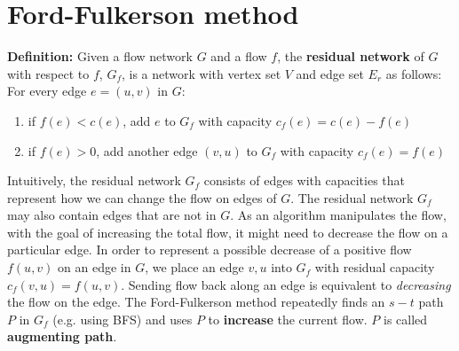 \section{Ford-Fulkerson method}
\textbf{Definition:}\newline
Given a flow network $G$ and a flow $f$, the \textbf{residual network} of $G$ with respect to $f$, $G_f$, is a network with vertex set $V$ and edge set $E_r$ as follows:\newline
For every edge $e = (u, v)$ in $G$:
\begin{enumerate}
    \item if $f(e) < c(e)$, add $e$ to $G_f$ with capacity $c_f(e) = c(e) - f(e)$

    \item if $f(e) > 0$, add another edge $(v, u)$ to $G_f$ with capacity $c_f(e) = f(e)$
\end{enumerate}
Intuitively, the residual network $G_f$ consists of edges with capacities that represent how we can change the flow on edges of $G$.\newline\newline
The residual network $G_f$ may also contain edges that are not in $G$. As an algorithm manipulates the flow, with the goal of increasing the total flow, it might need to decrease the flow on a particular edge. In order to represent a possible decrease of a positive flow $f(u, v)$ on an edge in $G$, we place an edge $v, u$ into $G_f$ with residual capacity $c_f(v, u) = f(u, v)$. Sending flow back along an edge is equivalent to \textit{decreasing} the flow on the edge.\newline\newline
The Ford-Fulkerson method repeatedly finds an $s-t$ path $P$ in $G_f$ (e.g. using BFS) and uses $P$ to \textbf{increase} the current flow. $P$ is called \textbf{augmenting path}.


